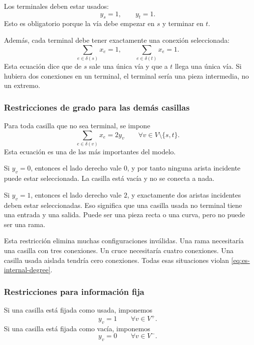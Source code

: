 Los terminales deben estar usados:
\begin{equation}
    y_s = 1,
    \qquad
    y_t = 1.
    \label{eq:es-terminals-used}
\end{equation}
Esto es obligatorio porque la vía debe empezar en \(s\) y terminar en \(t\).

Además, cada terminal debe tener exactamente una conexión seleccionada:
\begin{equation}
    \sum_{e \in \delta(s)} x_e = 1,
    \qquad
    \sum_{e \in \delta(t)} x_e = 1.
    \label{eq:es-terminal-degree}
\end{equation}
Esta ecuación dice que de \(s\) sale una única vía y que a \(t\) llega una única vía. Si hubiera dos conexiones en un terminal, el terminal sería una pieza intermedia, no un extremo.

\subsubsection{Restricciones de grado para las demás casillas}

Para toda casilla que no sea terminal, se impone
\begin{equation}
    \sum_{e \in \delta(v)} x_e = 2y_v
    \qquad \forall v \in V \setminus \{s,t\}.
    \label{eq:es-internal-degree}
\end{equation}
Esta ecuación es una de las más importantes del modelo.

Si \(y_v=0\), entonces el lado derecho vale \(0\), y por tanto ninguna arista incidente puede estar seleccionada. La casilla está vacía y no se conecta a nada.

Si \(y_v=1\), entonces el lado derecho vale \(2\), y exactamente dos aristas incidentes deben estar seleccionadas. Eso significa que una casilla usada no terminal tiene una entrada y una salida. Puede ser una pieza recta o una curva, pero no puede ser una rama.

Esta restricción elimina muchas configuraciones inválidas. Una rama necesitaría una casilla con tres conexiones. Un cruce necesitaría cuatro conexiones. Una casilla usada aislada tendría cero conexiones. Todas esas situaciones violan \eqref{eq:es-internal-degree}.

\subsubsection{Restricciones para información fija}

Si una casilla está fijada como usada, imponemos
\begin{equation}
    y_v = 1
    \qquad \forall v \in V^{+}.
    \label{eq:es-fixed-used}
\end{equation}
Si una casilla está fijada como vacía, imponemos
\begin{equation}
    y_v = 0
    \qquad \forall v \in V^{-}.
    \label{eq:es-fixed-empty}
\end{equation}

